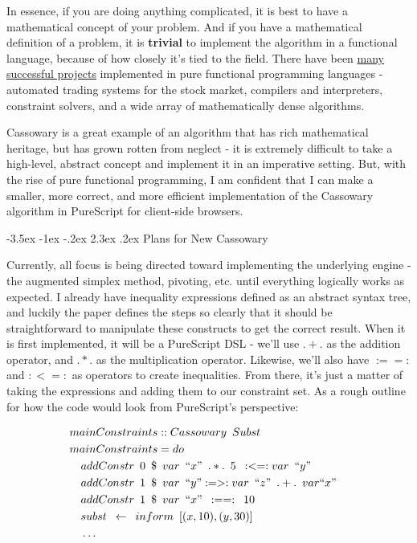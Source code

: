 \documentclass[11pt,pressrelease]{newlfm} %
\makeatletter
\newcounter{section}
\renewcommand\section{\@startsection {section}{1}{\z@}%
                                   {-3.5ex \@plus -1ex \@minus -.2ex}%
                                   {2.3ex \@plus.2ex}%
                                   {\normalfont\Large\bfseries}}
\makeatother
\begin{document}
\begin{newlfm}
\begin{singlespace}
In essence, if you are doing anything complicated, it is best to have a mathematical concept of
your problem. And if you have a mathematical definition of a problem, it is \textbf{trivial} to
implement the algorithm in a functional language, because of how closely it's tied to
the field. There have been
\href{https://wiki.haskell.org/Haskell_in_industry}{many successful projects} implemented in pure functional
programming languages - automated trading systems for the stock market, compilers and
interpreters, constraint solvers, and a wide array of mathematically dense algorithms.

Cassowary is a great example of an algorithm that has rich mathematical heritage, but has
grown rotten from neglect - it is extremely difficult to take a high-level, abstract concept
and implement it in an imperative setting. But, with the rise of pure functional programming,
I am confident that I can make a smaller, more correct, and more efficient implementation of the
Cassowary algorithm in PureScript for client-side browsers.

\section{Plans for New Cassowary}

Currently, all focus is being directed toward implementing the underlying engine - the augmented
simplex method, pivoting, etc. until everything logically works as expected. I already have
inequality expressions defined as an abstract syntax tree, and luckily the paper defines the
steps so clearly that it should be straightforward to manipulate these constructs to get the
correct result. When it is first implemented, it will be a PureScript DSL - we'll use
\(.+.\) as the addition operator, and \(.*.\) as the multiplication operator. Likewise,
we'll also have \(:==:\) and \(:<=:\) as operators to create inequalities. From there, it's
just a matter of taking the expressions and adding them to our constraint set. As a rough
outline for how the code would look from PureScript's perspective:

\begin{align*}
&mainConstraints :: Cassowary \enspace Subst&&\\
&mainConstraints = do&&\\
&\quad addConstr \enspace 0 \enspace \$ \enspace var \enspace ``x" \enspace .*. \enspace 5 \enspace :<=: var \enspace ``y"&&\\
&\quad addConstr \enspace 1 \enspace \$ \enspace var \enspace ``y" :=>: var \enspace ``z" \enspace .+. \enspace var ``x"&&\\
&\quad addConstr \enspace 1 \enspace \$ \enspace var \enspace ``x" \enspace :==: \enspace 10&&\\
&\quad subst \enspace \leftarrow \enspace inform \enspace [(x,10), (y,30)]&&\\
&\quad \ldots&&
\end{align*}


\end{singlespace}
\end{newlfm}
\end{document}
